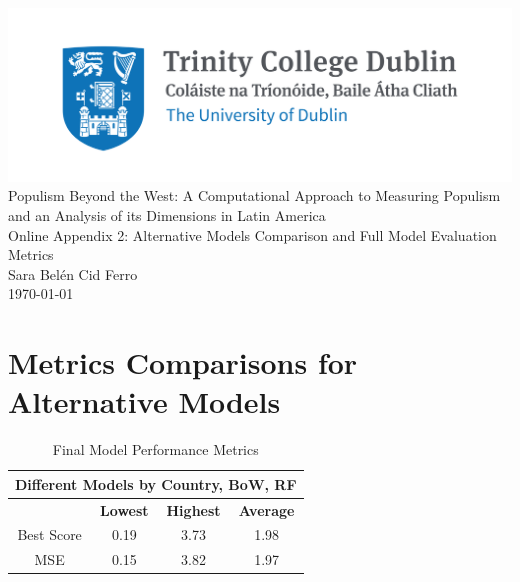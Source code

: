 \documentclass[12pt,letterpaper]{article}
\begin{document}
	
	
	\begin{titlepage}
		\centering
		\vspace*{1cm} %
		
		\includegraphics[width=\textwidth]{Trinity_RGB_transparent_main.png}\\[1cm]
		
		{\LARGE Populism Beyond the West: A Computational Approach to Measuring Populism and an Analysis of its Dimensions in Latin America}\\[1cm]
		{\Large Online Appendix 2: Alternative Models Comparison and Full Model Evaluation Metrics}\\[0.3cm]
		
		\Large Sara Belén Cid Ferro \\[1cm]
		
		{\large \today}
	\end{titlepage}
	
	
	\tableofcontents
	\listoffigures
	\listoftables
	
	\section{Metrics Comparisons for Alternative Models}
	
	\begin{table}[H]
		\centering
		\caption{Final Model Performance Metrics}
		\begin{tabular}{|c|c|c|c|}
			\hline
			\multicolumn{4}{|c|}{\textbf{Different Models by Country, BoW, RF}} \\
			\hline
			& \textbf{Lowest} & \textbf{Highest} & \textbf{Average} \\
			\hline
			Best Score & 0.19 & 3.73 & 1.98 \\
			\hline
			MSE & 0.15 & 3.82 & 1.97 \\
			\hline
		\end{tabular}
	\end{table}
	
\end{document}
